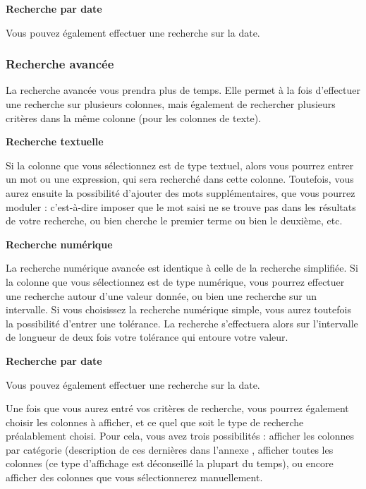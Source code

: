 \documentclass[12pt,a4paper]{article}
\begin{document}
            \medskip
            \textbf{Recherche par date}

            Vous pouvez également effectuer une recherche sur la date.

        \subsubsection{Recherche avancée}
            La recherche avancée vous prendra plus de temps. Elle permet à la fois d'effectuer une recherche sur plusieurs colonnes,
            mais également de rechercher plusieurs critères dans la même colonne (pour les colonnes de texte).

            \medskip
            \textbf{Recherche textuelle}

            Si la colonne que vous sélectionnez est de type textuel, alors vous pourrez entrer un mot ou une expression, qui sera recherché
            dans cette colonne. Toutefois, vous aurez ensuite la possibilité d'ajouter des mots supplémentaires, que vous pourrez moduler :
            c'est-à-dire imposer que le mot saisi ne se trouve pas dans les résultats de votre recherche, ou bien cherche le premier terme
            ou bien le deuxième, etc.

            \medskip
            \textbf{Recherche numérique}

            La recherche numérique avancée est identique à celle de la recherche simplifiée.
            Si la colonne que vous sélectionnez est de type numérique, vous pourrez effectuer une recherche autour d'une valeur donnée,
            ou bien une recherche sur un intervalle. Si vous choisissez la recherche numérique simple, vous aurez toutefois
            la possibilité d'entrer une tolérance. La recherche s'effectuera alors sur l'intervalle de longueur de deux fois votre tolérance
            qui entoure votre valeur.

            \medskip
            \textbf{Recherche par date}

            Vous pouvez également effectuer une recherche sur la date.

        \bigskip
        Une fois que vous aurez entré vos critères de recherche, vous pourrez
        également choisir les colonnes à afficher, et ce quel que soit le type
        de recherche préalablement choisi. Pour cela, vous avez trois
        possibilités : afficher les colonnes par catégorie (description de ces
        dernières dans l'annexe , afficher toutes les colonnes (ce type
        d'affichage est déconseillé la plupart du temps), ou encore afficher des
        colonnes que vous sélectionnerez manuellement.
\end{document}
